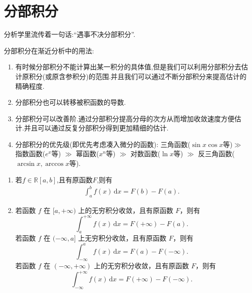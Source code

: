 \documentclass[../../main.tex]{subfiles}%
\begin{document}
\section{分部积分}

分析学里流传着一句话:“遇事不决分部积分”.

分部积分在渐近分析中的用法:
\begin{enumerate}[(1)]
\item\label{分部积分在渐近分析中的用法(1)} 有时候分部积分不能计算出某一积分的具体值,但是我们可以利用分部积分去估计原积分(或原含参积分)的范围.并且我们可以通过不断分部积分来提高估计的精确程度.

\item\label{分部积分在渐近分析中的用法(2)} 分部积分也可以转移被积函数的导数.

\item\label{分部积分在渐近分析中的用法(3)} 分部积分可以改善阶.通过分部积分提高分母的次方从而增加收敛速度方便估计.并且可以通过反复分部积分得到更加精细的估计.

\item 分部积分的优先级(即优先考虑凑入微分的函数): 三角函数($\sin x \cos x$等)$\gg $ 指数函数($e^x$等) $\gg $ 幂函数($x^n$等) $\gg $ 对数函数($\ln x$等) $\gg $ 反三角函数($\arcsin x,\arccos x$等). 
\end{enumerate}

\begin{theorem}\label{theorem:Newton-Leibniz公式}
\begin{enumerate}
\item 若$f\in \mathbb{R}[a,b]$,且有原函数$F$,则有
\begin{align*}
\int_a^b{f\left( x \right) \,\mathrm{d}x}=F\left( b \right) -F\left( a \right) .
\end{align*}

\item 若函数 \( f \) 在 \([a, +\infty)\) 上的无穷积分收敛，且有原函数 \( F \)，则有
\[
\int_a^{+\infty} f(x) \, \mathrm{d}x = F(+\infty) - F(a).
\]
若函数 \( f \) 在 \((-\infty, a]\) 上无穷积分收敛，且有原函数 \( F \)，则有
\[
\int_{-\infty}^a f(x) \, \mathrm{d}x = F(a) - F(-\infty).
\]
若函数 \( f \) 在 \((-\infty, +\infty)\) 上的无穷积分收敛，且有原函数 \( F \)，则有
\[
\int_{-\infty}^{+\infty} f(x) \, \mathrm{d}x = F(+\infty) - F(-\infty).
\]
\end{enumerate}
\end{theorem}
\end{document}
